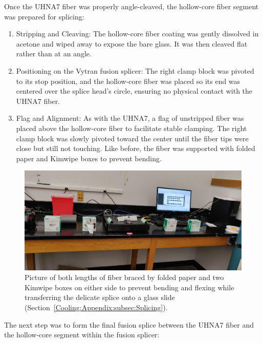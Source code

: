 Once the \ac{UHNA7} fiber was properly angle-cleaved, the hollow-core fiber segment was prepared for splicing:

\begin{enumerate}
	\item Stripping and Cleaving: The hollow-core fiber coating was gently dissolved in acetone and wiped away to expose the bare glass. It was then cleaved flat rather than at an angle.
	\item Positioning on the Vytran fusion splicer: The right clamp block was pivoted to its stop position, and the hollow-core fiber was placed so its end was centered over the splice head’s circle, ensuring no physical contact with the \ac{UHNA7} fiber.
	\item Flag and Alignment: As with the \ac{UHNA7}, a flag of unstripped fiber was placed above the hollow-core fiber to facilitate stable clamping. The right clamp block was slowly pivoted toward the center until the fiber tips were close but still not touching. Like before, the fiber was supported with folded paper and Kimwipe boxes to prevent bending.
\end{enumerate}

\begin{figure}[t]
  \centering
  \includegraphics[width=\textwidth]{figs/3-Cooling/doubleBoxBracedSplice.jpg}
  \caption{Picture of both lengths of fiber braced by folded paper and two Kimwipe boxes on either side to prevent bending and flexing while transferring the delicate splice onto a glass slide (Section~\ref{Cooling:Appendix:subsec:Splicing}).}
  \label{fig:double box braced splice}
\end{figure}

The next step was to form the final fusion splice between the \ac{UHNA7} fiber and the hollow-core segment within the fusion splicer:

